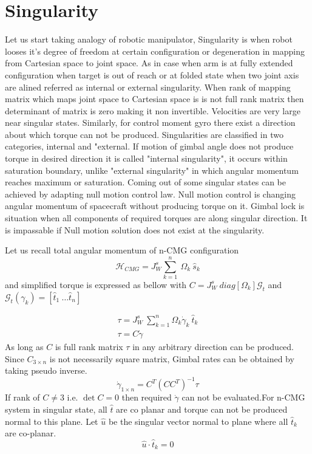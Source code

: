 \chapter{Singularity}
\label{chap:3}
Let us start taking analogy of robotic manipulator, Singularity is when robot looses it's degree of freedom at certain configuration or degeneration in mapping from Cartesian space to joint space. As in case when arm is at fully extended configuration when target is out of reach or at folded state when two joint axis are alined referred as internal or external singularity. When rank of mapping matrix which maps joint space to Cartesian space is is not full rank matrix then determinant of matrix is zero making it non invertible. Velocities are very large near singular states. Similarly, for control moment gyro there exist a direction about which torque can not be produced. Singularities are classified in two categories, internal and "external. If motion of gimbal angle does not produce torque in desired direction it is called "internal singularity", it occurs within saturation boundary, unlike "external singularity" in which angular momentum reaches maximum or saturation. Coming out of some singular states can be achieved by adapting null motion control law. Null motion control is changing angular momentum of spacecraft without producing torque on it. Gimbal lock is situation when all components of required torques are along singular direction. It is impassable if Null motion solution does not exist at the singularity.\cite{Leve2015}

Let us recall total angular momentum of n-CMG configuration
\begin{equation*}
\mathcal{H}_{CMG} =J^{s}_{W}\sum ^{n}_{k=1} \ \Omega _{k} \ \hat{s}_{k}
\end{equation*}
and simplified torque is expressed as bellow with $\displaystyle C=J^{s}_{W} \ diag[ \Omega _{k}]\mathcal{G}_{t}$ and $\displaystyle \mathcal{G}_{t}( \gamma _{k}) =[\hat{t}_{1} \ \dotsc \hat{t}_{n}]$ 

\begin{gather*}
\tau =J^{s}_{W} \ \sum ^{n}_{k=1} \Omega _{k}\dot{\gamma }_{k} \ \hat{t}_{k}\\
\tau =C\dot{\gamma }
\end{gather*}As long as $\displaystyle C$ is full rank matrix $\displaystyle \tau $ in any arbitrary direction can be produced. Since $\displaystyle C_{3\times n}$ is not necessarily square matrix, Gimbal rates can be obtained by taking pseudo inverse.
\begin{equation*}
\dot{\gamma }_{1\times n} =C^{T}\left( CC^{T}\right)^{-1} \tau 
\end{equation*}
If rank of $\displaystyle C\neq 3$ i.e. $\displaystyle \det C=0$ then required $\displaystyle \dot{\gamma }$ can not be evaluated.For n-CMG system in singular state, all $\displaystyle \hat{t}$ are co planar and torque can not be produced normal to this plane. Let $\displaystyle \hat{u}$ be the singular vector normal to plane where all $\displaystyle \hat{t}_{k}$ are co-planar. 
\begin{equation*}
\hat{u} \cdotp \hat{t}_{k} =0
\end{equation*}


